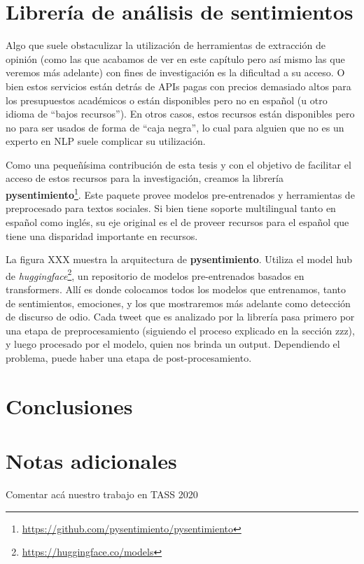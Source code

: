 \section{Librería de análisis de sentimientos}

\newcommand{\pysentimiento}[0]{\textbf{pysentimiento}}

Algo que suele obstaculizar la utilización de herramientas de extracción de opinión (como las que acabamos de ver en este capítulo pero así mismo las que veremos más adelante) con fines de investigación es la dificultad a su acceso. O bien estos servicios están detrás de APIs pagas con precios demasiado altos para los presupuestos académicos o están disponibles pero no en español (u otro idioma de ``bajos recursos''). En otros casos, estos recursos están disponibles pero no para ser usados de forma de ``caja negra'', lo cual para alguien que no es un experto en NLP suele complicar su utilización.

Como una pequeñísima contribución de esta tesis y con el objetivo de facilitar el acceso de estos recursos para la investigación, creamos la librería \textbf{pysentimiento}\footnote{\url{https://github.com/pysentimiento/pysentimiento}}. Este paquete provee modelos pre-entrenados y herramientas de preprocesado para textos sociales. Si bien tiene soporte multilingual tanto en español como inglés, su eje original es el de proveer recursos para el español que tiene una disparidad importante en recursos.

La figura XXX muestra la arquitectura de \pysentimiento{}. Utiliza el model hub de \emph{huggingface}\footnote{\url{https://huggingface.co/models}}, un repositorio de modelos pre-entrenados basados en transformers. Allí es donde colocamos todos los modelos que entrenamos, tanto de sentimientos, emociones, y los que mostraremos más adelante como detección de discurso de odio. Cada tweet que es analizado por la librería pasa primero por una etapa de preprocesamiento (siguiendo el proceso explicado en la sección zzz), y luego procesado por el modelo, quien nos brinda un output. Dependiendo el problema, puede haber una etapa de post-procesamiento.




%
%
%

\section{Conclusiones}

\section{Notas adicionales}

Comentar acá nuestro trabajo en TASS 2020